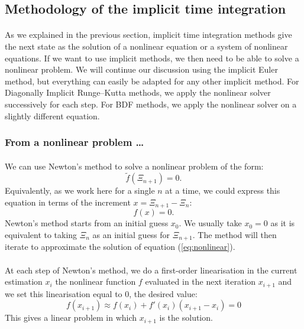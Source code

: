     \subsection{Methodology of the implicit time integration}

      \paragraph{}
      As we explained in the previous section, implicit time integration methods give the next state as the solution of a nonlinear equation or a system of nonlinear equations.
      If we want to use implicit methods, we then need to be able to solve a nonlinear problem.
      We will continue our discussion using the implicit Euler method, but everything can easily be adapted for any other implicit method.
      For Diagonally Implicit Runge--Kutta methods, we apply the nonlinear solver successively for each step.
      For BDF methods, we apply the nonlinear solver on a slightly different equation.


      \subsubsection{From a nonlinear problem \dots}

      	\paragraph{}
      	We can use Newton's method to solve a nonlinear problem of the form:
      	\begin{equation}
      		\tilde{f}\left(\Xi_{n+1}\right) = 0 .
      	\end{equation}
        Equivalently, as we work here for a single $n$ at a time, we could express this equation in terms of the increment $x = \Xi_{n+1} - \Xi_n$:
        \begin{equation}\label{eq:nonlinear}
      		f\left(x\right) = 0 .
      	\end{equation}
        Newton's method starts from an initial guess $x_0$.
        We usually take $x_0 = 0$ as it is equivalent to taking $\Xi_n$ as an initial guess for $\Xi_{n+1}$.
        The method will then iterate to approximate the solution of equation (\ref{eq:nonlinear}).

        \paragraph{}
        At each step of Newton's method, we do a first-order linearisation in the current estimation $x_i$ the nonlinear function $f$ evaluated  in the next iteration $x_{i+1}$ and we set this linearisation equal to 0, the desired value:
        \begin{equation}\label{eq:nonlinear_linearised}
          f\left(x_{i+1}\right) \approx f\left(x_i\right) + f'\left(x_i\right) \left( x_{i+1} - x_i \right) = 0
        \end{equation}
        This gives a linear problem in which $x_{i+1}$ is the solution.


